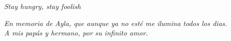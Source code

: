 \newpage \vspace*{8cm}
\thispagestyle{empty}

\begin{flushright}
   \emph{Stay hungry, stay foolish}\\
\end{flushright}



\newpage \vspace*{8cm}
\thispagestyle{empty}

\begin{flushright}
   \emph{En memoria de Ayla, que aunque ya no esté me ilumina todos los dias.}\\
   \emph{A mis papás y hermano, por su infinito amor.}
\end{flushright}
